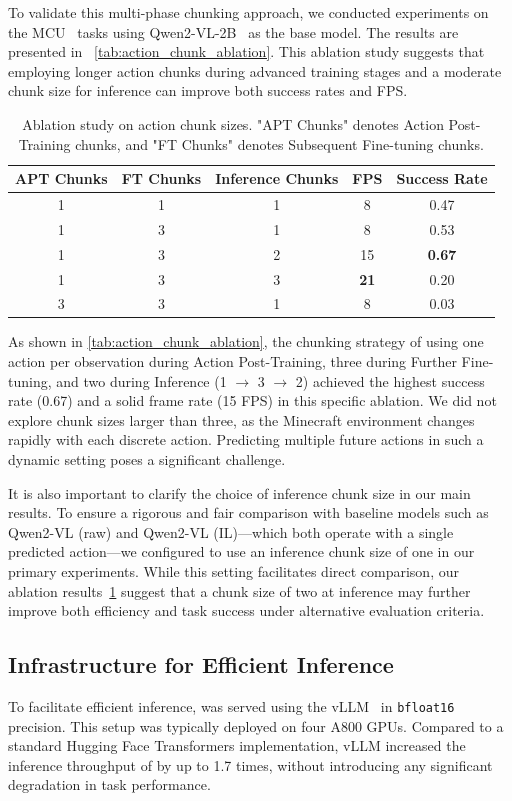 To validate this multi-phase chunking approach, we conducted experiments on the MCU~\citep{mcu} tasks using Qwen2-VL-2B~\citep{qwen2vl} as the base model. The results are presented in ~\autoref{tab:action_chunk_ablation}. This ablation study suggests that employing longer action chunks during advanced training stages and a moderate chunk size for inference can improve both success rates and FPS.

\begin{table}[htbp]
\centering
\caption{Ablation study on action chunk sizes. "APT Chunks" denotes Action Post-Training chunks, and "FT Chunks" denotes Subsequent Fine-tuning chunks.}
\label{tab:action_chunk_ablation}
\begin{tabular}{ccccc}
\toprule
APT Chunks & FT Chunks & Inference Chunks & FPS & Success Rate \\
\midrule
1 & 1 & 1 & 8  & 0.47 \\
1 & 3 & 1 & 8  & 0.53 \\
1 & 3 & 2 & 15 & \textbf{0.67} \\
1 & 3 & 3 & \textbf{21} & 0.20 \\
3 & 3 & 1 & 8  & 0.03 \\
\bottomrule
\end{tabular}
\end{table}

As shown in \autoref{tab:action_chunk_ablation}, the chunking strategy of using one action per observation during Action Post-Training, three during Further Fine-tuning, and two during Inference (1 $\rightarrow$ 3 $\rightarrow$ 2) achieved the highest success rate (0.67) and a solid frame rate (15 FPS) in this specific ablation. We did not explore chunk sizes larger than three, as the Minecraft environment changes rapidly with each discrete action. Predicting multiple future actions in such a dynamic setting poses a significant challenge.

It is also important to clarify the choice of inference chunk size in our main results. To ensure a rigorous and fair comparison with baseline models such as Qwen2-VL (raw) and Qwen2-VL (IL)—which both operate with a single predicted action—we configured \model to use an inference chunk size of one in our primary experiments. While this setting facilitates direct comparison, our ablation results~\ref{tab:action_chunk_ablation} suggest that a chunk size of two at inference may further improve both efficiency and task success under alternative evaluation criteria.

\subsection*{Infrastructure for Efficient Inference}
To facilitate efficient inference, \model was served using the vLLM~\citep{vllm} in \texttt{bfloat16} precision. This setup was typically deployed on four A800 GPUs. Compared to a standard Hugging Face Transformers implementation, vLLM increased the inference throughput of \model by up to 1.7 times, without introducing any significant degradation in task performance.

